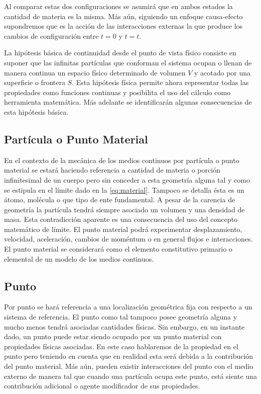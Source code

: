 \documentclass[../notas medios.tex]{subfiles}
\begin{document}
Al comparar estas dos configuraciones se asumirá que en ambos estados la
cantidad de materia es la misma.  Más aún, siguiendo un enfoque causa-efecto 
supondremos que es la acción de las interacciones externas la que produce los 
cambios de configuración entre $t=0$ y $t=t$.

La hipótesis básica de continuidad desde el punto de vista físico consiste en 
suponer que las infinitas partículas que conforman el sistema ocupan o llenan 
de manera continua un espacio físico determinado de volumen $V$ y acotado por 
una superficie o frontera $S$. Esta hipótesis física permite ahora representar 
todas las propiedades como funciones continuas y posibilita el uso del cálculo 
como herramienta matemática. Más adelante se identificarán algunas 
consecuencias de esta hipótesis básica.


\subsection{Partícula o Punto Material}
En el contexto de la mecánica de los medios continuos por partícula o punto 
material se estará haciendo referencia a cantidad de materia o porción 
infinitesimal de un cuerpo pero sin conceder a esta geometría alguna tal y como 
se estipula en el límite dado en la \cref{eq:material}.  Tampoco se detalla 
ésta 
es un átomo, molécula o que tipo de ente fundamental.  A pesar de la carencia 
de geometría la partícula tendrá siempre asociado un volumen y una densidad de 
masa.  Esta contradicción aparente es una consecuencia del uso del concepto 
matemático de límite.  El punto material podrá experimentar desplazamiento, 
velocidad, aceleración, cambios de moméntum o en general flujos e 
interacciones.  El punto material se considerará como el elemento constitutivo 
primario o elemental de un modelo de los medios continuos.

\subsection{Punto}
Por punto se hará referencia a una localización geométrica fija con respecto a un sistema de referencia.  El punto como tal tampoco posee geometría alguna y mucho menos tendrá asociadas cantidades físicas.  Sin embargo, en un instante dado, un punto puede estar siendo ocupado por un punto material con propiedades físicas asociadas.  En este caso hablaremos de la propiedad en el punto pero teniendo en cuenta que en realidad esta será debida a la contribución del punto material.  Más aún, pueden existir interacciones del punto con el medio externo de manera tal que cuando una partícula ocupa este punto, está siente una contribución adicional o agente modificador de sus propiedades.
\end{document}

